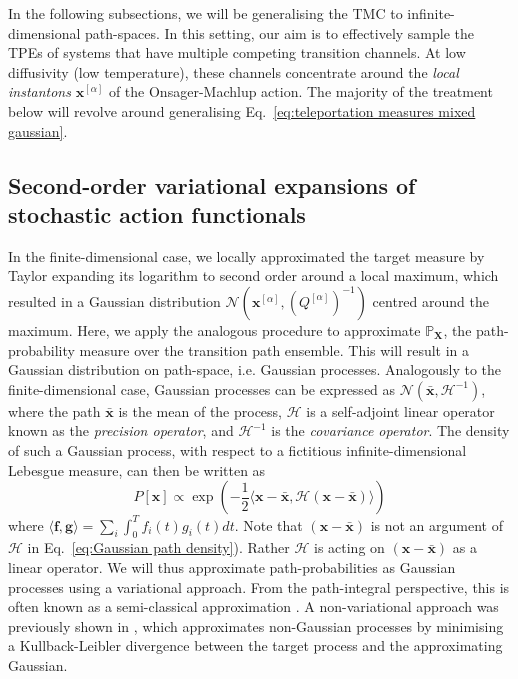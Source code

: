 In the following subsections, we will be generalising the TMC to infinite-dimensional path-spaces. In this setting, our aim is to effectively sample the TPEs of systems that have multiple competing transition channels. At low diffusivity (low temperature), these channels concentrate around the \textit{local instantons} $\mathbf{x}^{[\alpha]}$ of the Onsager-Machlup action. The majority of the treatment below will revolve around generalising Eq.~\ref{eq:teleportation measures mixed gaussian}.

\subsection{Second-order variational expansions of stochastic action functionals} \label{sec:Second-order variational expansions of stochastic action functionals}

In the finite-dimensional case, we locally approximated the target measure by Taylor expanding its logarithm to second order around a local maximum, which resulted in a Gaussian distribution $\mathcal{N}(\mathbf{x}^{[\alpha]}, (Q^{[\alpha]})^{-1})$ centred around the maximum. Here, we apply the analogous procedure to approximate $\mathbb{P}_\mathbf{X}$, the path-probability measure over the transition path ensemble. This will result in a Gaussian distribution on path-space, i.e. Gaussian processes. Analogously to the finite-dimensional case, Gaussian processes can be expressed as $\mathcal{N}(\bar{\mathbf{x}}, \mathcal{H}^{-1})$, where the path $\bar{\mathbf{x}}$ is the mean of the process, $\mathcal{H}$ is a self-adjoint linear operator known as the \textit{precision operator}, and $\mathcal{H}^{-1}$ is the \textit{covariance operator}. The density of such a Gaussian process, with respect to a fictitious infinite-dimensional Lebesgue measure, can then be written as
\begin{equation} \label{eq:Gaussian path density}
P[\mathbf{x}] \propto \exp \left( - \frac{1}{2} \langle \mathbf{x}-\bar{\mathbf{x}}, \mathcal{H} (\mathbf{x}-\bar{\mathbf{x}}) \rangle \right)	
\end{equation} 
where $\langle \mathbf{f},\mathbf{g}\rangle=\sum_{i}\int_{0}^{T}f_{i}(t)g_{i}(t)dt$. Note that $(\mathbf{x} - \bar{\mathbf{x}})$ is not an argument of $\mathcal{H}$ in Eq.~\ref{eq:Gaussian path density}). Rather $\mathcal{H}$ is acting on $(\mathbf{x} - \bar{\mathbf{x}})$ as a linear operator. We will thus approximate path-probabilities as Gaussian processes using a variational approach. From the path-integral perspective, this is often known as a semi-classical approximation \citep{chaichianPathIntegralsPhysics2001, schulmanTechniquesApplicationsPath1996, smirnovEstimationPathIntegral2010, moretteDefinitionApproximationFeynman1951, marinovPathIntegralsQuantum1980, sakuraiModernQuantumMechanics2017}. A non-variational approach was previously shown in \cite{luGaussianApproximationsTransition2017a}, which approximates non-Gaussian processes by minimising a Kullback-Leibler divergence between the target process and the approximating Gaussian.

